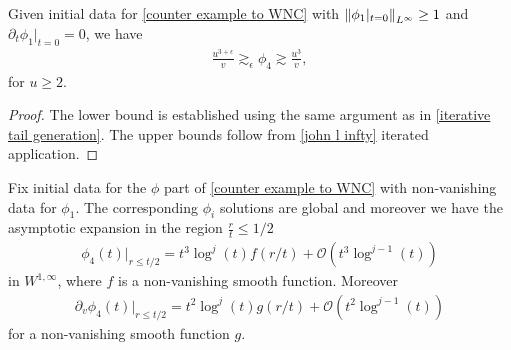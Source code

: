 \documentclass[11pt, oneside]{amsart}
\begin{document}
	\begin{lemma}\label{phi growth}
		Given initial data for \cref{counter example to WNC} with $\left\lVert \phi_1|_{t=0}\right\rVert_{L^\infty}\geq 1$ and $\partial_t\phi_1|_{t=0}=0$, we have 
		\begin{equation*}
			\begin{gathered}
				\frac{u^{3+\epsilon}}{v}\gtrsim_\epsilon\phi_4\gtrsim \frac{u^3}{v},
			\end{gathered}
		\end{equation*}
		for $u\geq2$.
	\end{lemma}
	\begin{proof}
		The lower bound is established using the same argument as in \cref{iterative tail generation}. The upper bounds follow from \cref{john l infty} iterated application.
	\end{proof}

	\begin{lemma}\label{lemma asymptotic of phi4}
		Fix initial data for the $\phi$ part of \cref{counter example to WNC} with non-vanishing data for $\phi_1$. The corresponding $\phi_i$ solutions are global and moreover we have the asymptotic expansion in the region $\frac{r}{t}\leq1/2$
		\begin{equation}\label{asymptotics of phi4}
			\begin{gathered}
				\phi_4(t)|_{r\leq t/2}=t^3\log^j(t)f(r/t)+\mathcal{O}(t^3 \log^{j-1}(t))
			\end{gathered}
		\end{equation}
		in $W^{1,\infty}$, where $f$ is a non-vanishing smooth function. Moreover 
		\begin{equation}\label{asymptotics of dv phi4}
			\begin{gathered}
				\partial_v\phi_4(t)|_{r\leq t/2}=t^2\log^j(t)g(r/t)+\mathcal{O}(t^2 \log^{j-1}(t))
			\end{gathered}
		\end{equation}
		for a non-vanishing smooth function $g$.
	\end{lemma}
\end{document}
